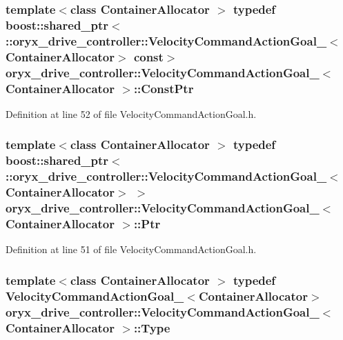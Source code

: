 \subsubsection[{\-Const\-Ptr}]{\setlength{\rightskip}{0pt plus 5cm}template$<$class Container\-Allocator $>$ typedef boost\-::shared\-\_\-ptr$<$ \-::{\bf oryx\-\_\-drive\-\_\-controller\-::\-Velocity\-Command\-Action\-Goal\-\_\-}$<$\-Container\-Allocator$>$ const$>$ {\bf oryx\-\_\-drive\-\_\-controller\-::\-Velocity\-Command\-Action\-Goal\-\_\-}$<$ \-Container\-Allocator $>$\-::{\bf \-Const\-Ptr}}\label{structoryx__drive__controller_1_1VelocityCommandActionGoal___a0d13ae09346d060f6010d1710f2f3b1e}


\-Definition at line 52 of file \-Velocity\-Command\-Action\-Goal.\-h.

\subsubsection[{\-Ptr}]{\setlength{\rightskip}{0pt plus 5cm}template$<$class Container\-Allocator $>$ typedef boost\-::shared\-\_\-ptr$<$ \-::{\bf oryx\-\_\-drive\-\_\-controller\-::\-Velocity\-Command\-Action\-Goal\-\_\-}$<$\-Container\-Allocator$>$ $>$ {\bf oryx\-\_\-drive\-\_\-controller\-::\-Velocity\-Command\-Action\-Goal\-\_\-}$<$ \-Container\-Allocator $>$\-::{\bf \-Ptr}}\label{structoryx__drive__controller_1_1VelocityCommandActionGoal___a5327e1b9666b39b639426b35db063ef2}


\-Definition at line 51 of file \-Velocity\-Command\-Action\-Goal.\-h.

\subsubsection[{\-Type}]{\setlength{\rightskip}{0pt plus 5cm}template$<$class Container\-Allocator $>$ typedef {\bf \-Velocity\-Command\-Action\-Goal\-\_\-}$<$\-Container\-Allocator$>$ {\bf oryx\-\_\-drive\-\_\-controller\-::\-Velocity\-Command\-Action\-Goal\-\_\-}$<$ \-Container\-Allocator $>$\-::{\bf \-Type}}\label{structoryx__drive__controller_1_1VelocityCommandActionGoal___ac96f0b1085e9317ac3be94d383fab6aa}


